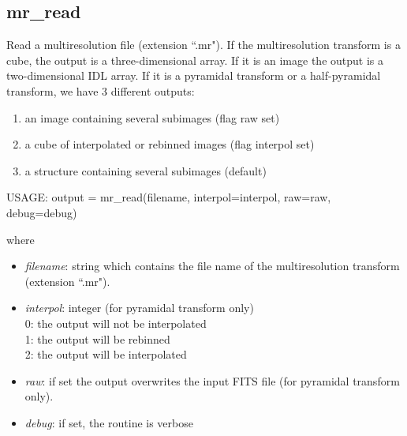 \subsection{mr\_read}
Read a multiresolution file (extension ``.mr"). If the multiresolution
transform is a cube, the output is a three-dimensional array. 
If it is an image the output is a two-dimensional IDL array.
If it is a pyramidal transform or a half-pyramidal transform, 
we have 3 different outputs:
\begin{enumerate}
\item an image containing several subimages (flag raw set)
\item a cube of interpolated or rebinned images (flag interpol set)
\item a structure containing several subimages  (default)
\end{enumerate}
{\bf
\begin{center}
     USAGE: output = mr\_read(filename, interpol=interpol, raw=raw, debug=debug)
\end{center}}
where 
\begin{itemize}
\item {\em filename}: string which contains the file name of 
the multiresolution transform (extension ``.mr").
\item {\em interpol}: integer (for pyramidal transform only) \\
0: the output will not be interpolated \\
1: the output will be rebinned \\
2: the output will be interpolated \\
\item {\em raw}: if set the output overwrites the 
input FITS file (for pyramidal transform only).
\item {\em debug}: if set, the routine is verbose
\end{itemize}

